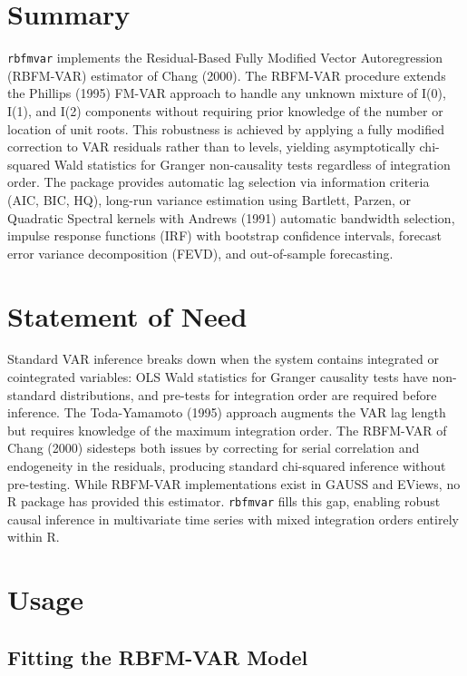 \section{Summary}\label{summary}

\texttt{rbfmvar} implements the Residual-Based Fully Modified Vector
Autoregression (RBFM-VAR) estimator of Chang (2000). The RBFM-VAR
procedure extends the Phillips (1995) FM-VAR approach to handle any
unknown mixture of I(0), I(1), and I(2) components without requiring
prior knowledge of the number or location of unit roots. This robustness
is achieved by applying a fully modified correction to VAR residuals
rather than to levels, yielding asymptotically chi-squared Wald
statistics for Granger non-causality tests regardless of integration
order. The package provides automatic lag selection via information
criteria (AIC, BIC, HQ), long-run variance estimation using Bartlett,
Parzen, or Quadratic Spectral kernels with Andrews (1991) automatic
bandwidth selection, impulse response functions (IRF) with bootstrap
confidence intervals, forecast error variance decomposition (FEVD), and
out-of-sample forecasting.

\section{Statement of Need}\label{statement-of-need}

Standard VAR inference breaks down when the system contains integrated
or cointegrated variables: OLS Wald statistics for Granger causality
tests have non-standard distributions, and pre-tests for integration
order are required before inference. The Toda-Yamamoto (1995) approach
augments the VAR lag length but requires knowledge of the maximum
integration order. The RBFM-VAR of Chang (2000) sidesteps both issues by
correcting for serial correlation and endogeneity in the residuals,
producing standard chi-squared inference without pre-testing. While
RBFM-VAR implementations exist in GAUSS and EViews, no R package has
provided this estimator. \texttt{rbfmvar} fills this gap, enabling
robust causal inference in multivariate time series with mixed
integration orders entirely within R.

\section{Usage}\label{usage}

\subsection{Fitting the RBFM-VAR
Model}\label{fitting-the-rbfm-var-model}

